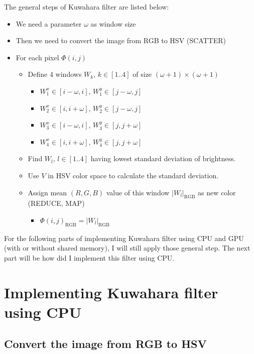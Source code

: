 \documentclass{article}
\begin{document}
	The general steps of Kuwahara filter are listed below:
	
	\begin{itemize}
		\item We need a parameter $\omega$ as window size
		\item Then we need to convert the image from RGB to HSV (SCATTER)
		\item For each pixel $\Phi(i, j)$
		\begin{itemize}
			\item Define 4 windows $W_k$, $k \in [1..4]$ of size $(\omega + 1) \times (\omega + 1)$
			\begin{itemize}
				\item $W_1^x \in [i - \omega, i]$, $W_1^y \in [j - \omega, j]$
				\item $W_2^x \in [i, i + \omega]$, $W_2^y \in [j - \omega, j]$
				\item $W_3^x \in [i - \omega, i]$, $W_3^y \in [j, j + \omega]$
				\item $W_4^x \in [i, i + \omega]$, $W_4^y \in [j, j + \omega]$
			\end{itemize}
			\item Find $W_l$, $l \in [1..4]$ having lowest standard deviation of brightness.
			\item Use $V$ in HSV color space to calculate the standard deviation.
			\item Assign mean $(R, G, B)$ value of this window $|W_l|_\text{RGB}$ as new color (REDUCE, MAP) 
			\begin{itemize}
				\item $\Phi(i, j)_\text{RGB} = |W_l|_\text{RGB}$
			\end{itemize}
		\end{itemize}
	\end{itemize}
	
	For the following parts of implementing Kuwahara filter using CPU and GPU (with or without shared memory), I will still apply those general step. The next part will be how did I implement this filter using CPU.
	
	\section{Implementing Kuwahara filter using CPU}
	
	\subsection{Convert the image from RGB to HSV}
	
\end{document}
